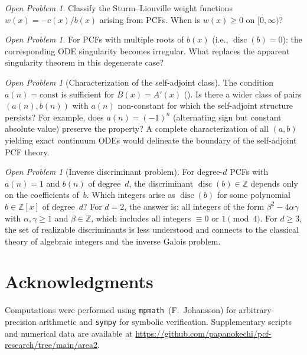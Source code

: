 \documentclass[11pt,a4paper]{amsart}
\theoremstyle{plain}
\theoremstyle{definition}
\theoremstyle{remark}
\newtheorem{open}[theorem]{Open Problem}
\newcommand{\Z}{\mathbb{Z}}
\newcommand{\disc}{\operatorname{disc}}
\begin{document}
\begin{open}
Classify the Sturm--Liouville weight functions $w(x) = -c(x)/b(x)$
arising from PCFs.  When is $w(x) \ge 0$ on $[0,\infty)$?
\end{open}

\begin{open}
For PCFs with multiple roots of $b(x)$ (i.e., $\disc(b) = 0$):
the corresponding ODE singularity becomes irregular.  What
replaces the apparent singularity theorem in this degenerate case?
\end{open}

\begin{open}[Characterization of the self-adjoint class]
The condition $a(n) = \mathrm{const}$ is sufficient for
$B(x) = A'(x)$ ().
Is there a wider class of pairs $(a(n), b(n))$ with $a(n)$
non-constant for which the self-adjoint structure persists?
For example, does $a(n) = (-1)^n$ (alternating sign but
constant absolute value) preserve the property?
A complete characterization of all $(a,b)$ yielding
exact continuum ODEs would delineate the boundary of the
self-adjoint PCF theory.
\end{open}

\begin{open}[Inverse discriminant problem]
For degree-$d$ PCFs with $a(n)=1$ and $b(n)$ of degree~$d$,
the discriminant $\disc(b) \in \Z$ depends only on the
coefficients of~$b$.  Which integers arise as $\disc(b)$ for
some polynomial~$b \in \Z[x]$ of degree~$d$?  For $d=2$, the
answer is: all integers of the form $\beta^2 - 4\alpha\gamma$
with $\alpha,\gamma \ge 1$ and $\beta \in \Z$, which includes
all integers $\equiv 0$ or $1 \pmod{4}$.  For $d \ge 3$, the
set of realizable discriminants is less understood and connects
to the classical theory of algebraic integers and the inverse
Galois problem.
\end{open}

\section*{Acknowledgments}

Computations were performed using
\texttt{mpmath}~(F.~Johansson) for arbitrary-precision
arithmetic and \texttt{sympy} for symbolic
verification.  Supplementary scripts and
numerical data are available at
\url{https://github.com/papanokechi/pcf-research/tree/main/area2}.
\end{document}
